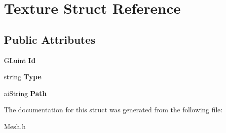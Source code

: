 \hypertarget{struct_texture}{}\section{Texture Struct Reference}
\label{struct_texture}
\subsection*{Public Attributes}
\begin{DoxyCompactItemize}
\item 
\hypertarget{struct_texture_acf30e9166c5024f270dc826e66693fcd}{}G\+Luint {\bfseries Id}\label{struct_texture_acf30e9166c5024f270dc826e66693fcd}

\item 
\hypertarget{struct_texture_a62ae00f64423f7af8b880cdc72bfbb7f}{}string {\bfseries Type}\label{struct_texture_a62ae00f64423f7af8b880cdc72bfbb7f}

\item 
\hypertarget{struct_texture_a0742fa0e3bab2af20a9d94837e1eae44}{}ai\+String {\bfseries Path}\label{struct_texture_a0742fa0e3bab2af20a9d94837e1eae44}

\end{DoxyCompactItemize}


The documentation for this struct was generated from the following file\+:\begin{DoxyCompactItemize}
\item 
Mesh.\+h\end{DoxyCompactItemize}
